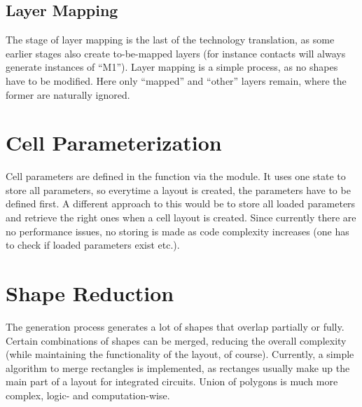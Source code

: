 \subsection{Layer Mapping}
The stage of layer mapping is the last of the technology translation, as some earlier stages also create to-be-mapped layers (for instance contacts will always
generate instances of \enquote{M1}). Layer mapping is a simple process, as no shapes have to be modified. Here only \enquote{mapped} and \enquote{other} layers
remain, where the former are naturally ignored.

\section{Cell Parameterization}
Cell parameters are defined in the  function via the  module. It uses one state to store all parameters, so everytime a
layout is created, the parameters have to be defined first. A different approach to this would be to store all loaded parameters and retrieve the right ones when a
cell layout is created. Since currently there are no performance issues, no storing is made as code complexity increases (one has to check if loaded parameters exist
etc.). 

\section{Shape Reduction}
The generation process generates a lot of shapes that overlap partially or fully. Certain combinations of shapes can be merged, reducing the overall complexity
(while maintaining the functionality of the layout, of course). Currently, a simple algorithm to merge rectangles is implemented, as rectanges usually make up
the main part of a layout for integrated circuits. Union of polygons is much more complex, logic- and computation-wise.

